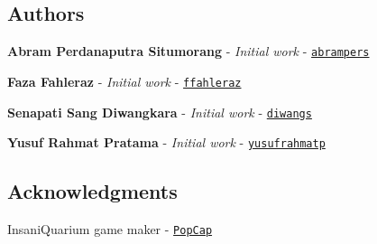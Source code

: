 \subsection*{Authors}


\begin{DoxyItemize}
\item {\bfseries Abram Perdanaputra Situmorang} -\/ {\itshape Initial work} -\/ \href{https://github.com/abrampers}{\tt abrampers}
\item {\bfseries Faza Fahleraz} -\/ {\itshape Initial work} -\/ \href{https://github.com/ffahleraz}{\tt ffahleraz}
\item {\bfseries Senapati Sang Diwangkara} -\/ {\itshape Initial work} -\/ \href{https://github.com/diwangs}{\tt diwangs}
\item {\bfseries Yusuf Rahmat Pratama} -\/ {\itshape Initial work} -\/ \href{https://github.com/yusufrahmatp}{\tt yusufrahmatp}
\end{DoxyItemize}

\subsection*{Acknowledgments}


\begin{DoxyItemize}
\item Insani\+Quarium game maker -\/ \href{https://www.ea.com/studios/popcap}{\tt Pop\+Cap} 
\end{DoxyItemize}